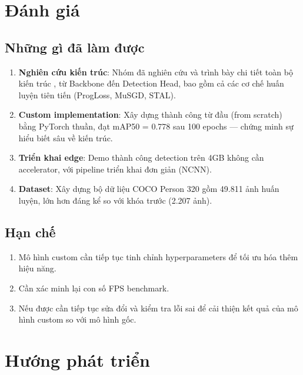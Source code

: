 \section{Đánh giá}
\label{sec:results_evaluation}

\subsection{Những gì đã làm được}

\begin{enumerate}[label=\arabic*)]
    \item \textbf{Nghiên cứu kiến trúc}: Nhóm đã nghiên cứu và trình bày chi tiết toàn bộ kiến trúc \yolo, từ Backbone đến Detection Head, bao gồm cả các cơ chế huấn luyện tiên tiến (ProgLoss, MuSGD, STAL).

    \item \textbf{Custom implementation}: Xây dựng thành công \yolo từ đầu (from scratch) bằng PyTorch thuần, đạt mAP50 = 0.778 sau 100 epochs --- chứng minh sự hiểu biết sâu về kiến trúc.

    \item \textbf{Triển khai edge}: Demo thành công detection trên \rpi 4GB không cần accelerator, với pipeline triển khai đơn giản (NCNN).

    \item \textbf{Dataset}: Xây dựng bộ dữ liệu COCO Person 320 gồm 49.811 ảnh huấn luyện, lớn hơn đáng kể so với khóa trước (2.207 ảnh).
\end{enumerate}

\subsection{Hạn chế}

\begin{enumerate}[label=\arabic*)]
    \item Mô hình custom cần tiếp tục tinh chỉnh hyperparameters để tối ưu hóa thêm hiệu năng.
    \item Cần xác minh lại con số FPS benchmark.
    \item Nếu được cần tiếp tục sửa đổi và kiểm tra lỗi sai để cải thiện kết quả của mô hình custom so với mô hình gốc.
\end{enumerate}

\section{Hướng phát triển}
\label{sec:results_future}

